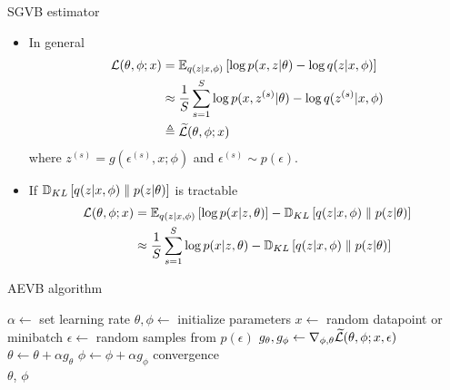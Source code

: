 \documentclass[unicode,11pt]{beamer}
\begin{document}
\begin{frame}{SGVB estimator}
  \begin{itemize}
  \item In general
    \begin{align*}
      \mathcal{L}(\theta, \phi; x)
      &= \E{q(z|x, \phi)}{\log p(x, z|\theta) - \log q(z|x, \phi)} \\
      &\approx \frac{1}{S} \sum\limits_{s = 1}^S
            \log p(x, z^{(s)}|\theta) - \log q(z^{(s)}|x, \phi) \\
      &\triangleq \widetilde{\mathcal{L}}(\theta, \phi; x)
    \end{align*}
    where $z^{(s)} = g(\epsilon^{(s)}, x; \phi)$ and $\epsilon^{(s)} \sim p(\epsilon)$.
  \item If $\mathbb{D}_{KL}\left[ q(z|x, \phi) \parallel p(z|\theta) \right]$ is tractable
    \begin{align*}
      \mathcal{L}(\theta, \phi; x)
      &= \E{q(z|x, \phi)}{\log p(x|z, \theta)} - \KL{q(z|x, \phi)}{p(z|\theta)} \\
      &\approx \frac{1}{S} \sum\limits_{s = 1}^S \log p(x|z, \theta)
       - \KL{q(z|x, \phi)}{p(z|\theta)}
    \end{align*}
  \end{itemize}
\end{frame}


\begin{frame}{AEVB algorithm}
  \centering
  \begin{algorithmic}
    \State $\alpha \gets$ set learning rate
    \State $\theta, \phi \gets$ initialize parameters
    \Repeat
       \State $x \gets$ random datapoint or minibatch
       \State $\epsilon \gets$ random samples from $p(\epsilon)$
       \State $g_\theta, g_\phi \gets \grad_{\phi, \theta} %
           \mathcal{\widetilde{L}}(\theta, \phi; x, \epsilon)$
       \State $\theta \gets \theta + \alpha g_\theta$
       \State $\phi \gets \phi + \alpha g_\phi$
    \Until convergence \\
    \Return $\theta$, $\phi$
  \end{algorithmic}
\end{frame}
\end{document}
